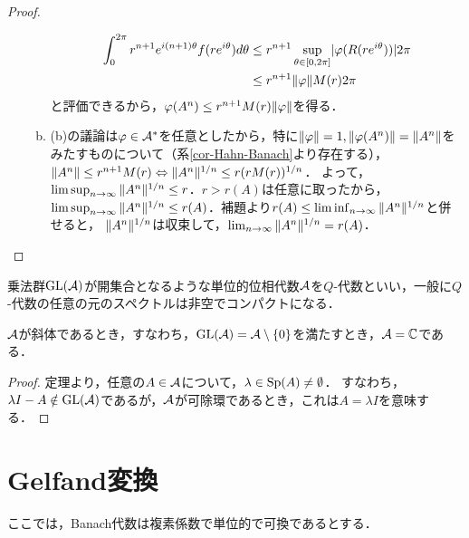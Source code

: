 \documentclass[uplatex,dvipdfmx]{jsreport}
\begin{document}
\begin{proof}
\begin{enumerate}
\begin{enumerate}[(a)]
\begin{align*}
                \int^{2\pi}_0r^{n+1}e^{i(n+1)\theta}f(re^{i\theta})d\theta&\le r^{n+1}\sup_{\theta\in[0,2\pi]}\lvert\varphi(R(re^{i\theta}))\rvert2\pi\\
                &\le r^{n+1}\|\varphi\|M(r)2\pi
            \end{align*}
            と評価できるから，$\varphi(A^n)\le r^{n+1}M(r)\|\varphi\|$を得る．
            \item (b)の議論は$\varphi\in\mathcal{A}^*$を任意としたから，特に$\|\varphi\|=1,\|\varphi(A^n)\|=\|A^n\|$をみたすものについて（系\ref{cor-Hahn-Banach}より存在する），
            $\|A^n\|\le r^{n+1}M(r)\Leftrightarrow\|A^n\|^{1/n}\le r(rM(r))^{1/n}$．
            よって，$\limsup_{n\to\infty}\|A^n\|^{1/n}\le r$．$r>r(A)$は任意に取ったから，
            $\limsup_{n\to\infty}\|A^n\|^{1/n}\le r(A)$．補題より$r(A)\le\liminf_{n\to\infty}\|A^n\|^{1/n}$と併せると，
            $\|A^n\|^{1/n}$は収束して，$\lim_{n\to\infty}\|A^n\|^{1/n}=r(A)$．
        \end{enumerate}
    \end{enumerate}
\end{proof}
\begin{remarks}
    乗法群$\mathrm{GL}(\mathcal{A})$が開集合となるような単位的位相代数$\mathcal{A}$を$Q$-代数といい，一般に$Q$-代数の任意の元のスペクトルは非空でコンパクトになる．
\end{remarks}

\begin{corollary}\label{cor-Gelfand-Mazur-thm}
    $\mathcal{A}$が斜体であるとき，すなわち，$\mathrm{GL}(\mathcal{A})=\mathcal{A}\setminus\{0\}$を満たすとき，$\mathcal{A}=\mathbb{C}$である．
\end{corollary}
\begin{proof}
    定理より，任意の$A\in\mathcal{A}$について，$\lambda\in\mathrm{Sp}(A)\ne\emptyset$．
    すなわち，$\lambda I-A\notin\mathrm{GL}(\mathcal{A})$であるが，$\mathcal{A}$が可除環であるとき，これは$A=\lambda I$を意味する．
\end{proof}

\section{Gelfand変換}

\begin{tcolorbox}[colframe=ForestGreen, colback=ForestGreen!10!white,breakable,colbacktitle=ForestGreen!40!white,coltitle=black,fonttitle=\bfseries\sffamily,
title=]
    ここでは，Banach代数は複素係数で単位的で可換であるとする．
\end{tcolorbox}
\end{document}
